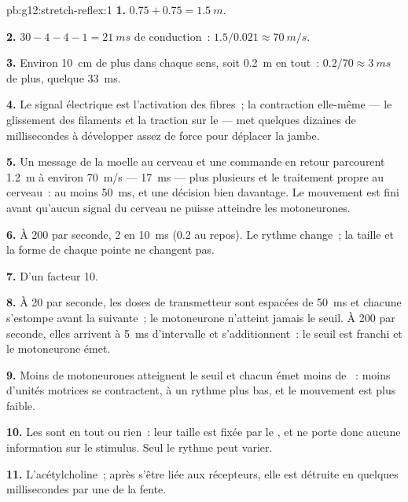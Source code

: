 \begin{solution}{pb:g12:stretch-reflex:1}
\textbf{1.} $0.75 + 0.75 = \qty{1.5}{m}$.

\textbf{2.} $30 - 4 - 4 - 1 = \qty{21}{ms}$ de conduction~: $1.5/0.021
\approx \qty{70}{m/s}$.

\textbf{3.} Environ \qty{10}{cm} de plus dans chaque sens, soit
\qty{0.2}{m} en tout~: $0.2/70 \approx \qty{3}{ms}$ de plus, quelque
\qty{33}{ms}.

\textbf{4.} Le signal électrique est l'activation des fibres~; la
contraction elle-même --- le glissement des filaments et la traction
sur le  --- met quelques dizaines de millisecondes à développer
assez de force pour déplacer la jambe.

\textbf{5.} Un message de la moelle au cerveau et une commande en
retour parcourent \qty{1.2}{m} à environ \qty{70}{m/s} ---
\qty{17}{ms} --- plus plusieurs  et le traitement propre au
cerveau~: au moins \qty{50}{ms}, et une décision bien davantage. Le
mouvement est fini avant qu'aucun signal du cerveau ne puisse
atteindre les motoneurones.

\textbf{6.} À 200 par seconde, 2  en \qty{10}{ms}
(0.2 au repos). Le rythme change~; la taille et la forme de chaque
pointe ne changent pas.

\textbf{7.} D'un facteur 10.

\textbf{8.} À 20 par seconde, les doses de transmetteur sont espacées
de \qty{50}{ms} et chacune s'estompe avant la suivante~; le
motoneurone n'atteint jamais le seuil. À 200 par seconde, elles
arrivent à \qty{5}{ms} d'intervalle et s'additionnent~: le seuil est
franchi et le motoneurone émet.

\textbf{9.} Moins de motoneurones atteignent le seuil et chacun émet
moins de ~: moins d'unités motrices se contractent,
à un rythme plus bas, et le mouvement est plus faible.

\textbf{10.} Les  sont en tout ou rien~: leur
taille est fixée par le , et ne porte donc aucune information
sur le stimulus. Seul le rythme peut varier.

\textbf{11.} L'acétylcholine~; après s'être liée aux récepteurs, elle
est détruite en quelques millisecondes par une  de la fente.


\end{solution}
